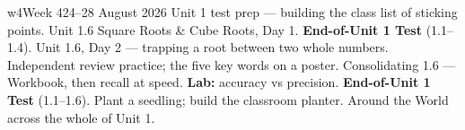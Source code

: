 \documentclass[11pt]{article}
\begin{document}
\clearpage
\renewcommand{\currentweek}{Week 4 \sep 24--28 August}

\begin{weekoverview}{w4}{Week 4}{24--28 August 2026}
  {Unit 1 test prep --- building the class list of sticking points.}
  {Unit 1.6 Square Roots \& Cube Roots, Day 1.}
  {\textbf{End-of-Unit 1 Test} (1.1--1.4).}
  {Unit 1.6, Day 2 --- trapping a root between two whole numbers.}
  {Independent review practice; the five key words on a poster.}
  {Consolidating 1.6 --- Workbook, then recall at speed.}
  {\textbf{Lab:} accuracy vs precision.}
  {\textbf{End-of-Unit 1 Test} (1.1--1.6).}
  {Plant a seedling; build the classroom planter.}
  {Around the World across the whole of Unit 1.}
\end{weekoverview}

\begin{weeklinks}
\end{weeklinks}

\end{document}
